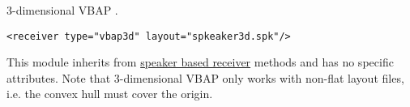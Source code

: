 3-dimensional VBAP \cite{Pulkki1997}.

\begin{lstlisting}[numbers=none]
<receiver type="vbap3d" layout="spkeaker3d.spk"/>
\end{lstlisting}

%

This module inherits from \hyperref[attrtab:speakerbased]{speaker based receiver} methods and has no specific attributes. Note that 3-dimensional VBAP only works with non-flat layout files, i.e. the convex hull must cover the origin.
